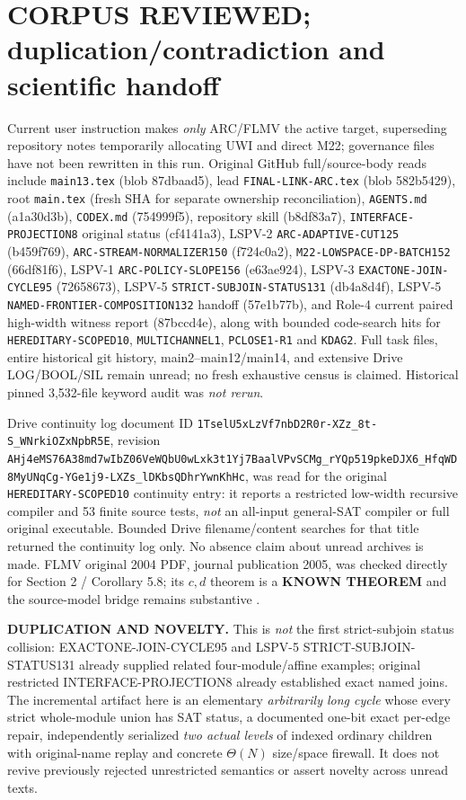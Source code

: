 \documentclass[11pt]{article}
\begin{document}
\section{CORPUS REVIEWED; duplication/contradiction and scientific handoff}
Current user instruction makes \emph{only} ARC/FLMV the active target, superseding repository notes temporarily allocating UWI and direct M22; governance files have not been rewritten in this run. Original GitHub full/source-body reads include \texttt{main13.tex} (blob 87dbaad5), lead \texttt{FINAL-LINK-ARC.tex} (blob 582b5429), root \texttt{main.tex} (fresh SHA for separate ownership reconciliation), \texttt{AGENTS.md} (a1a30d3b), \texttt{CODEX.md} (754999f5), repository skill (b8df83a7), \texttt{INTERFACE-PROJECTION8} original status (cf4141a3), LSPV-2 \texttt{ARC-ADAPTIVE-CUT125} (b459f769), \texttt{ARC-STREAM-NORMALIZER150} (f724c0a2), \texttt{M22-LOWSPACE-DP-BATCH152} (66df81f6), LSPV-1 \texttt{ARC-POLICY-SLOPE156} (e63ae924), LSPV-3 \texttt{EXACTONE-JOIN-CYCLE95} (72658673), LSPV-5 \texttt{STRICT-SUBJOIN-STATUS131} (db4a8d4f), LSPV-5 \texttt{NAMED-FRONTIER-COMPOSITION132} handoff (57e1b77b), and Role-4 current paired high-width witness report (87bccd4e), along with bounded code-search hits for \texttt{HEREDITARY-SCOPED10}, \texttt{MULTICHANNEL1}, \texttt{PCLOSE1-R1} and \texttt{KDAG2}. Full task files, entire historical git history, main2--main12/main14, and extensive Drive LOG/BOOL/SIL remain unread; no fresh exhaustive census is claimed. Historical pinned 3,532-file keyword audit was \emph{not rerun}.

Drive continuity log document ID \texttt{1TselU5xLzVf7nbD2R0r-XZz_8t-S_WNrkiOZxNpbR5E}, revision \texttt{AHj4eMS76A38md7wIbZ06VeWQbU0wLxk3t1Yj7BaalVPvSCMg\_rYQp519pkeDJX6\_HfqWD8MyUNqCg-YGe1j9-LXZs\_lDKbsQDhrYwnKhHc}, was read for the original \texttt{HEREDITARY-SCOPED10} continuity entry: it reports a restricted low-width recursive compiler and 53 finite source tests, \emph{not} an all-input general-SAT compiler or full original executable. Bounded Drive filename/content searches for that title returned the continuity log only. No absence claim about unread archives is made. FLMV original 2004 PDF, journal publication 2005, was checked directly for Section 2 / Corollary 5.8; its \(c,d\) theorem is a \textbf{KNOWN THEOREM} and the source-model bridge remains substantive \cite{flmv}.

\noindent\textbf{DUPLICATION AND NOVELTY.}
This is \emph{not} the first strict-subjoin status collision: EXACTONE-JOIN-CYCLE95 and LSPV-5 STRICT-SUBJOIN-STATUS131 already supplied related four-module/affine examples; original restricted INTERFACE-PROJECTION8 already established exact named joins. The incremental artifact here is an elementary \emph{arbitrarily long cycle} whose every strict whole-module union has SAT status, a documented one-bit exact per-edge repair, independently serialized \emph{two actual levels} of indexed ordinary children with original-name replay and concrete \(\Theta(N)\) size/space firewall. It does not revive previously rejected unrestricted semantics or assert novelty across unread texts.
\end{document}
